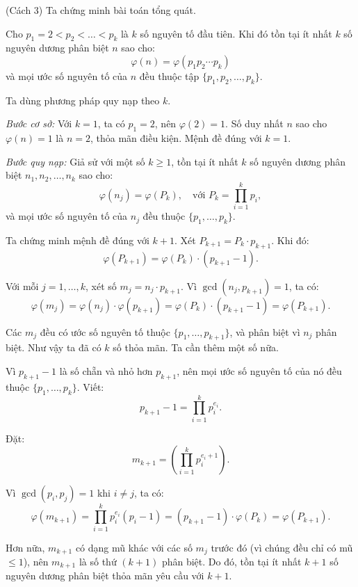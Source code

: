 \documentclass[../09-contruction-methods.tex]{subfiles}
\begin{document}

\newpage

\begin{soln}(Cách 3)\footnotemark
	Ta chứng minh bài toán tổng quát.
	\begin{claim*}
		Cho \( p_1 = 2 < p_2 < \dots < p_k \) là \( k \) số nguyên tố đầu tiên. Khi đó tồn tại ít nhất \( k \) số nguyên dương phân biệt \( n \) sao cho:
		\[
			\varphi(n) = \varphi(p_1p_2\cdots p_k)
		\]
		và mọi ước số nguyên tố của \( n \) đều thuộc tập \( \{p_1, p_2, \dots, p_k\} \).
	\end{claim*}
	\begin{subproof}
		Ta dùng phương pháp quy nạp theo \( k \).
	
		\textit{Bước cơ sở:} Với \( k = 1 \), ta có \( p_1 = 2 \), nên \( \varphi(2) = 1 \).  
		Số duy nhất \( n \) sao cho \( \varphi(n) = 1 \) là \( n = 2 \), thỏa mãn điều kiện. Mệnh đề đúng với \( k = 1 \).
		
		\textit{Bước quy nạp:} Giả sử với một số \( k \geq 1 \), tồn tại ít nhất \( k \) số nguyên dương phân biệt \( n_1, n_2, \dots, n_k \) sao cho:
		\[
			\varphi(n_j) = \varphi(P_k), \quad \text{với } P_k = \prod_{i=1}^k p_i,
		\]
		và mọi ước số nguyên tố của \( n_j \) đều thuộc \( \{p_1, \dots, p_k\} \).
		
		Ta chứng minh mệnh đề đúng với \( k + 1 \).
		Xét \( P_{k+1} = P_k \cdot p_{k+1} \). Khi đó:
		\[
			\varphi(P_{k+1}) = \varphi(P_k) \cdot (p_{k+1} - 1).
		\]
		
		Với mỗi \( j = 1, \dots, k \), xét số \( m_j = n_j \cdot p_{k+1} \).  
		Vì \( \gcd(n_j, p_{k+1}) = 1 \), ta có:
		\[
			\varphi(m_j) = \varphi(n_j) \cdot \varphi(p_{k+1}) = \varphi(P_k) \cdot (p_{k+1} - 1) = \varphi(P_{k+1}).
		\]
		
		Các \( m_j \) đều có ước số nguyên tố thuộc \( \{p_1, \dots, p_{k+1}\} \), và phân biệt vì \( n_j \) phân biệt.
		Như vậy ta đã có \( k \) số thỏa mãn. Ta cần thêm một số nữa.
		
		Vì \( p_{k+1} - 1 \) là số chẵn và nhỏ hơn \( p_{k+1} \), nên mọi ước số nguyên tố của nó đều thuộc \( \{p_1, \dots, p_k\} \).  
		Viết:
		\[
			p_{k+1} - 1 = \prod_{i=1}^k p_i^{e_i}.
		\]
		
		Đặt:
		\[
			m_{k+1} = \left( \prod_{i=1}^k p_i^{e_i + 1} \right).
		\]
		
		Vì \( \gcd(p_i, p_j) = 1 \) khi \( i \ne j \), ta có:
		\[
			\varphi(m_{k+1}) = \prod_{i=1}^k p_i^{e_i}(p_i - 1) = (p_{k+1} - 1) \cdot \varphi(P_k) = \varphi(P_{k+1}).
		\]
		
		Hơn nữa, \( m_{k+1} \) có dạng mũ khác với các số \( m_j \) trước đó (vì chúng đều chỉ có mũ \( \leq 1 \)), nên \( m_{k+1} \) là số thứ \( (k+1) \) phân biệt.
		Do đó, tồn tại ít nhất \( k+1 \) số nguyên dương phân biệt thỏa mãn yêu cầu với \( k+1 \).
	\end{subproof}
\end{soln}

\end{document}
